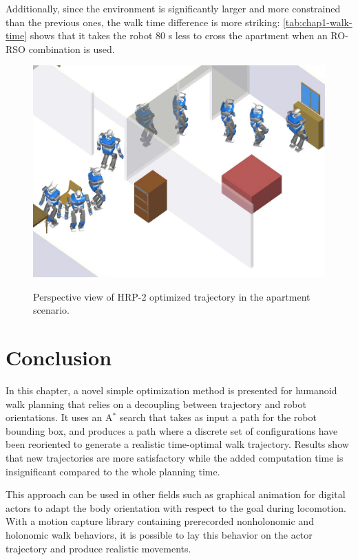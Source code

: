 Additionally, since the environment is significantly larger and more
constrained than the previous ones, the walk time difference is more
striking: \autoref{tab:chap1-walk-time} shows that it takes the robot
80 s less to cross the apartment when an RO-RSO combination is used.

\begin{figure}
  \centering
      {\includegraphics[width = \linewidth]
        {src/chap1-path-optimization/apartment-hash-optim-perspective-hrp2.png}}
      \caption{Perspective view of HRP-2 optimized trajectory in the
        apartment scenario.}
      \label{fig:chap1-apartment-hash-optim-perspective-hrp2}
\end{figure}

\section{Conclusion}
In this chapter, a novel simple optimization method is
presented for humanoid walk planning that relies on a decoupling
between trajectory and robot orientations. It uses an A$^{*}$ search that
takes as input a path for the robot bounding box, and produces a path
where a discrete set of configurations have been reoriented to generate
a realistic time-optimal walk trajectory. Results show that new
trajectories are more satisfactory while the added computation time is
insignificant compared to the whole planning time.

This approach can be used in other fields such as graphical animation
for digital actors to adapt the body orientation with respect to the
goal during locomotion. With a motion capture library containing
prerecorded nonholonomic and holonomic walk behaviors, it is possible
to lay this behavior on the actor trajectory and produce realistic
movements.

